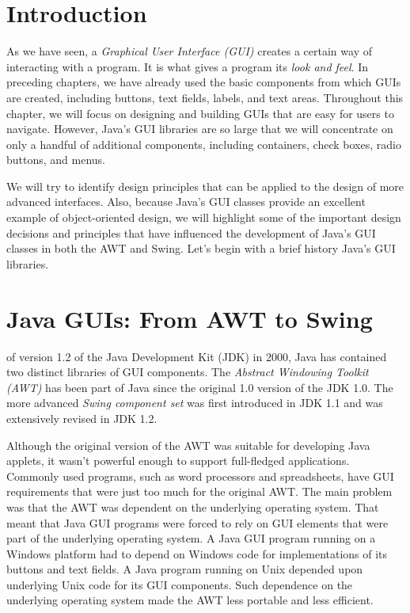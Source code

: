 \section{Introduction}
\label{introduction}
\noindent As we have seen, a {\it Graphical User Interface (GUI)}
creates a certain way of interacting with a program.  It is what gives
a program its {\it look and feel}. In preceding chapters, we have
already used the basic components from which GUIs are created,
including buttons, text fields, labels, and text areas.  Throughout
this chapter, we will focus on designing and building GUIs that are
easy for users to navigate.  However, Java's GUI libraries are so
large that we will concentrate on only a handful of additional
components, including containers, check boxes, radio buttons, and
menus.

We will try to identify design principles that can be applied to the
design of more advanced interfaces.  Also, because Java's GUI classes
provide an excellent example of object-oriented design, we will
highlight some of the important design decisions and principles that
have influenced the development of Java's GUI classes in both the AWT
and Swing.  Let's begin with a brief history Java's GUI libraries.

\section{Java GUIs: From AWT to Swing}
\label{java-gu-is-from-aw-tto-swing}
\WWWjava
 of version 1.2 of the Java
Development Kit (JDK) in 2000, Java has contained two distinct
libraries of GUI components.  The {\it Abstract Windowing Toolkit
(AWT)} has been part of Java since the original 1.0 version of the JDK
1.0.  The more advanced {\em Swing component set} was first introduced
in JDK 1.1 and was extensively revised in JDK 1.2.

Although the original version of the AWT was suitable for developing
Java applets, it wasn't powerful enough to support full-fledged
applications. Commonly used programs, such as word processors and
spreadsheets, have GUI requirements that were just too much for the
original AWT.  The main problem was that the AWT was dependent on the
underlying operating system. That meant that Java GUI programs were
forced to rely on GUI elements that were part of the underlying
operating system. A Java GUI program running on a Windows platform had
to depend on Windows code for implementations of its buttons and text
fields.  A Java program running on Unix depended upon underlying Unix
code for its GUI components. Such dependence on the underlying
operating system made the AWT less portable and less efficient.

